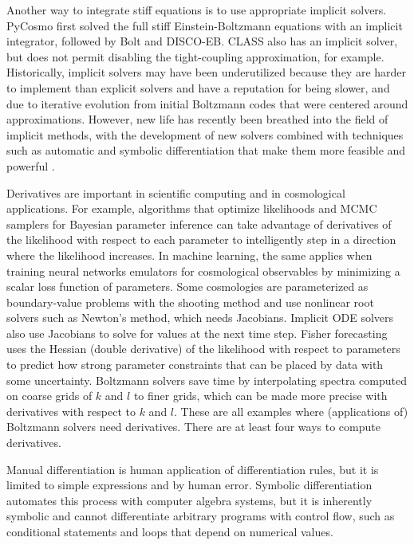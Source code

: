 \documentclass{aa}
\begin{document}
Another way to integrate stiff equations is to use appropriate implicit solvers.
PyCosmo first solved the full stiff Einstein-Boltzmann equations with an implicit integrator, followed by Bolt and DISCO-EB.
CLASS also has an implicit solver, but does not permit disabling the tight-coupling approximation, for example.
Historically, implicit solvers may have been underutilized because they are harder to implement than explicit solvers and have a reputation for being slower,
and due to iterative evolution from initial Boltzmann codes that were centered around approximations.
However, new life has recently been breathed into the field of implicit methods, with the development of new solvers combined with techniques such as automatic and symbolic differentiation that make them more feasible and powerful \citep[e.g.,][]{steinebachConstructionRosenbrockWanner2023,ekanathanFullyAdaptiveRadau2025}.

Derivatives are important in scientific computing and in cosmological applications.
For example, algorithms that optimize likelihoods and MCMC samplers for Bayesian parameter inference can take advantage of derivatives of the likelihood with respect to each parameter to intelligently step in a direction where the likelihood increases.
In machine learning, the same applies when training neural networks emulators for cosmological observables by minimizing a scalar loss function of parameters.
Some cosmologies are parameterized as boundary-value problems with the shooting method and use nonlinear root solvers such as Newton's method, which needs Jacobians.
Implicit ODE solvers also use Jacobians to solve for values at the next time step.
Fisher forecasting uses the Hessian (double derivative) of the likelihood with respect to parameters to predict how strong parameter constraints that can be placed by data with some uncertainty.
Boltzmann solvers save time by interpolating spectra computed on coarse grids of $k$ and $l$ to finer grids, which can be made more precise with derivatives with respect to $k$ and $l$.
These are all examples where (applications of) Boltzmann solvers need derivatives. There are at least four ways to compute derivatives.

Manual differentiation is human application of differentiation rules,
but it is limited to simple expressions and by human error.
Symbolic differentiation automates this process with computer algebra systems,
but it is inherently symbolic and cannot differentiate arbitrary programs with control flow, such as conditional statements and loops that depend on numerical values.
\end{document}
